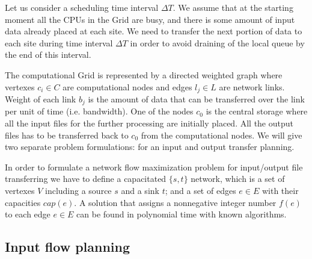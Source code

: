 \documentclass[english]{ddny}
\begin{document}
Let us consider a scheduling time interval $\Delta T$. We assume that at the
starting moment all the CPUs in the Grid are busy, and there is some amount of
input data already placed at each site. We need to transfer the next portion
of data to each site during time interval $\Delta T$ in order to avoid
draining of the local queue by the end of this interval. 

The computational Grid is represented by a directed weighted graph where
vertexes $c_{i} \in C$ are computational nodes and edges $l_{j} \in L$ are
network links. Weight of each link $b_{j}$ is the amount of data that can be
transferred over the link per unit of time (i.e. bandwidth). One of the nodes
$c_{0}$ is the central storage where all the input files for the further
processing are initially placed. All the output files has to be transferred
back to $c_{0}$ from the computational nodes. We will give two separate
problem formulations: for an input and output transfer planning. 

In order to formulate a network flow maximization problem \cite{Network_flows}
for input/output file transferring we have to define a capacitated $\{s,t\}$
network, which is a set of vertexes $V$ including a source $s$ and a sink $t$;
and a set of edges $e\in E$ with their capacities $cap(e)$. A solution that
assigns a nonnegative integer number $f(e)$ to each edge $e \in E$ can be
found in polynomial time with known algorithms.

\subsection{Input flow planning}
\label{inproblem}
\end{document}
